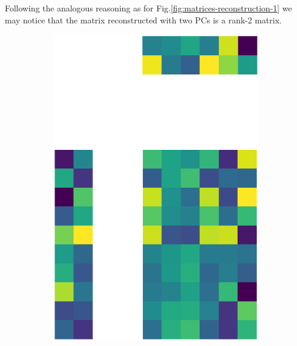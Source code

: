 \documentclass[10pt,twocolumn]{article}
\begin{document}
Following the analogous reasoning as for Fig.\ref{fig:matrices-reconstruction-1} we may notice that the matrix reconstructed with two PCs is a rank-2 matrix.


\begin{figure}[H]
\begin{subfigure}[t]{.15\textwidth}
\centering
\includegraphics[scale=.2]{DWGs/random-matrix-reconstruction-PCs-2.eps}
\caption{ }
\end{subfigure}
\begin{subfigure}[t]{.15\textwidth}
\centering

\end{subfigure}
\end{figure}
\end{document}
